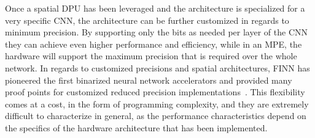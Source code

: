 Once a spatial DPU has been leveraged and the architecture is specialized for a very specific CNN, the architecture can be further customized in regards to minimum precision.  By supporting only the bits as needed per layer of the CNN they can achieve even higher performance and efficiency, while in an MPE, the hardware will support the maximum precision that is required over the whole network. In regards to customized precisions and spatial architectures, FINN has pioneered the first binarized neural network accelerators \cite{umuroglu2017finn,fraser2017scaling} and provided many proof points for customized reduced precision implementations~\cite{blott2018finnr}. 
This flexibility comes at a cost, in the form of programming complexity, and they are extremely difficult to characterize in general, as the performance characteristics depend on the specifics of the hardware architecture that has been implemented.

